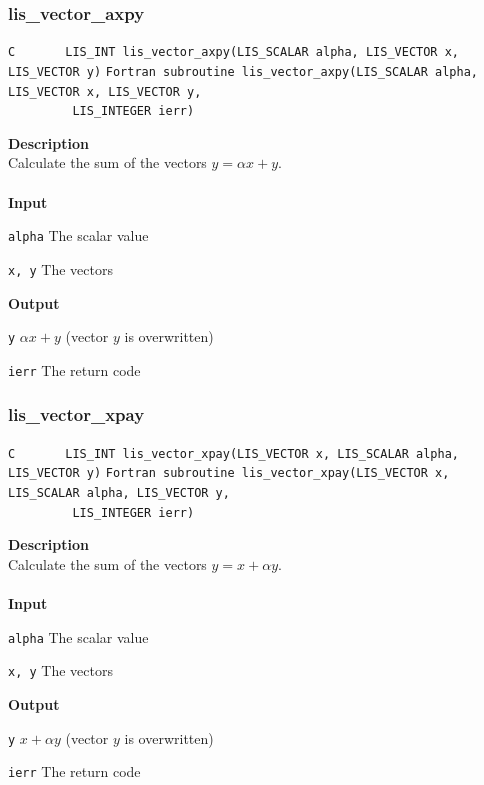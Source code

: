 \documentclass[a4paper]{article}
\newcommand{\namelistlabel}[1]{\mbox{#1}\hfill}
\newenvironment{namelist}[1]{%
\begin{list}{}
  {\let\makelabel\namelistlabel
  \settowidth{\labelwidth}{#1}
  \setlength{\leftmargin}{1.1\labelwidth}}
  }{%
\end{list}}
\begin{document}
\newpage
\subsubsection{lis\_vector\_axpy}
\begin{screen}
\verb|C       LIS_INT lis_vector_axpy(LIS_SCALAR alpha, LIS_VECTOR x, LIS_VECTOR y)|
\verb|Fortran subroutine lis_vector_axpy(LIS_SCALAR alpha, LIS_VECTOR x, LIS_VECTOR y,|\\
\verb|         LIS_INTEGER ierr)|
\end{screen}
{\bf Description}\\
\indent
Calculate the sum of the vectors $y = \alpha x + y$.
\\ \\
\noindent
{\bf Input}
\begin{namelist}{XXXXXXXXXXXXXXXXXXXX}
\item[\tt alpha] The scalar value
\item[\tt x, y] The vectors
\end{namelist}
{\bf Output}
\begin{namelist}{XXXXXXXXXXXXXXXXXXXX}
\item[\tt y] $\alpha x + y$ (vector $y$ is overwritten)
\item[\tt ierr] The return code
\end{namelist}

\subsubsection{lis\_vector\_xpay}
\begin{screen}
\verb|C       LIS_INT lis_vector_xpay(LIS_VECTOR x, LIS_SCALAR alpha, LIS_VECTOR y)|
\verb|Fortran subroutine lis_vector_xpay(LIS_VECTOR x, LIS_SCALAR alpha, LIS_VECTOR y,|\\
\verb|         LIS_INTEGER ierr)|
\end{screen}
{\bf Description}\\
\indent
Calculate the sum of the vectors $y = x + \alpha y$.
\\ \\
\noindent
{\bf Input}
\begin{namelist}{XXXXXXXXXXXXXXXXXXXX}
\item[\tt alpha] The scalar value
\item[\tt x, y] The vectors
\end{namelist}
{\bf Output}
\begin{namelist}{XXXXXXXXXXXXXXXXXXXX}
\item[\tt y] $x + \alpha y$ (vector $y$ is overwritten)
\item[\tt ierr] The return code
\end{namelist}
\end{document}
